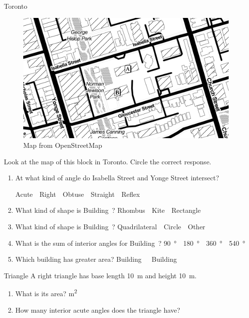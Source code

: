 \documentclass[12pt,letterpaper]{article}
\begin{document}
\begin{problem}{Toronto}
\begin{figure}[h]
  \begin{center}
    \includegraphics[trim=50 50 50 50, clip, width=.5\textwidth]{toronto.png}
  \end{center}
  \caption{Map from OpenStreetMap}
\end{figure}

 Look at the map of this block in Toronto. Circle the correct response.

 \begin{enumerate}
  \item At what kind of angle do Isabella Street and Yonge Street intersect?

  \hfill Acute~~Right~~Obtuse~~Straight~~Reflex

  \item What kind of shape is Building~?
  \hfill Rhombus~~Kite~~Rectangle

  \item What kind of shape is Building~?
  \hfill Quadrilateral~~Circle~~Other

  \item What is the sum of interior angles for Building~? \hfill
  \SI{90}{\degree}~~\SI{180}{\degree}~~\SI{360}{\degree}~~\SI{540}{\degree}

  \item Which building has greater area?
  \hfill Building~~~Building~
 \end{enumerate}
\end{problem}

\begin{problem}{Triangle}
 A right triangle has base length \SI{10}{\meter}
 and height \SI{10}{\meter}.

 \begin{enumerate}
  \item What is its area?
  \hfill \underline{\hspace{3em}} \si{\meter^2}
  \item How many interior acute angles does the triangle have?
  \hfill \underline{\hspace{3em}}
 \end{enumerate}
\end{problem}
\end{document}
